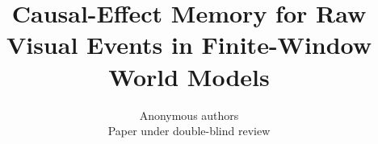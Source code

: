 \documentclass{article}
\title{Causal-Effect Memory for Raw Visual Events in Finite-Window World Models}
\author{Anonymous authors\\Paper under double-blind review}
\begin{document}
\maketitle
\begin{abstract}

\end{abstract}


\clearpage
\appendix

\end{document}
